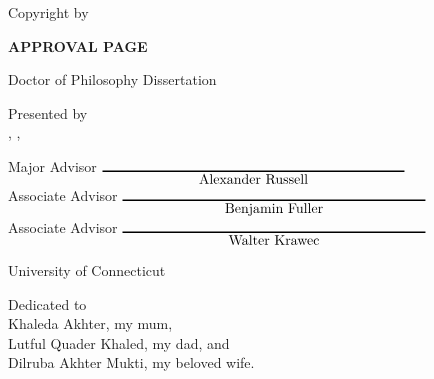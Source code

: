 \pagestyle{plain}
\setcounter{page}{2} %
\phantom{skip}
\vspace{.5in}
\begin{center}
Copyright by

\vspace{1in}
\myname

\vspace{4.5in}
\myyear
\end{center}
\newpage


\begin{center}
{\large\bf APPROVAL PAGE}

\vspace{.5in}
Doctor of Philosophy Dissertation

\vspace{.5in}
{\LARGE\bf\mythesistitle}

\vspace{.5in}
Presented by\\
\myname, \degreeoneshort, \degreetwoshort
\vspace{.75in}
\end{center}

\begin{center}
\begin{minipage}{4.5in}
Major Advisor \hfill$\underset{\hbox{\majoradvisor}}{\rule{3in}{1pt}}$\\[15pt]

Associate Advisor \hfill$\underset{\hbox{\associateone}}{\rule{3in}{1pt}}$\\[15pt]

Associate Advisor \hfill$\underset{\hbox{\associatetwo}}{\rule{3in}{1pt}}$
\end{minipage}

\vspace{1in}
University of Connecticut\\
\myyear
\end{center}


\newpage


\pagestyle{plain}
\clearpage
\begin{center}
    \thispagestyle{empty}
    \vspace*{\fill}
      Dedicated to \\
      Khaleda Akhter, my mum, \\
      Lutful Quader Khaled, my dad, and \\
      Dilruba Akhter Mukti, my beloved wife.
    \vspace*{\fill}
\end{center}
\clearpage
\newpage


